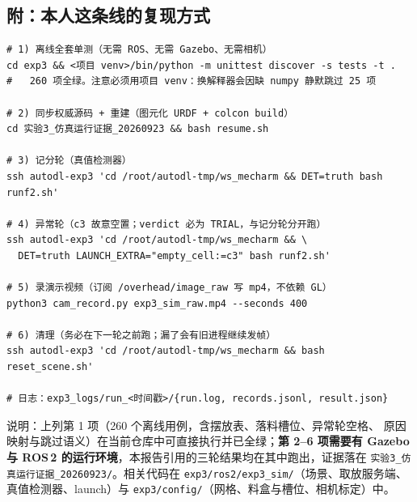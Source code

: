 \documentclass[12pt,a4paper]{ctexart}
\begin{document}
\subsection*{附：本人这条线的复现方式}

\begin{lstlisting}[numbers=none]
# 1) 离线全套单测（无需 ROS、无需 Gazebo、无需相机）
cd exp3 && <项目 venv>/bin/python -m unittest discover -s tests -t .
#   260 项全绿。注意必须用项目 venv：换解释器会因缺 numpy 静默跳过 25 项

# 2) 同步权威源码 + 重建（图元化 URDF + colcon build）
cd 实验3_仿真运行证据_20260923 && bash resume.sh

# 3) 记分轮（真值检测器）
ssh autodl-exp3 'cd /root/autodl-tmp/ws_mecharm && DET=truth bash runf2.sh'

# 4) 异常轮（c3 故意空置；verdict 必为 TRIAL，与记分轮分开跑）
ssh autodl-exp3 'cd /root/autodl-tmp/ws_mecharm && \
  DET=truth LAUNCH_EXTRA="empty_cell:=c3" bash runf2.sh'

# 5) 录演示视频（订阅 /overhead/image_raw 写 mp4，不依赖 GL）
python3 cam_record.py exp3_sim_raw.mp4 --seconds 400

# 6) 清理（务必在下一轮之前跑；漏了会有旧进程继续发帧）
ssh autodl-exp3 'cd /root/autodl-tmp/ws_mecharm && bash reset_scene.sh'

# 日志：exp3_logs/run_<时间戳>/{run.log, records.jsonl, result.json}
\end{lstlisting}

\vspace{2mm}
{\small 说明：上列第 1 项（260 个离线用例，含摆放表、落料槽位、异常轮空格、
原因映射与跳过语义）在当前仓库中可直接执行并已全绿；\textbf{第 2--6 项需要有
Gazebo 与 ROS\,2 的运行环境}，本报告引用的三轮结果均在其中跑出，证据落在
\texttt{实验3\_仿真运行证据\_20260923/}。相关代码在
\texttt{exp3/ros2/exp3\_sim/}（场景、取放服务端、真值检测器、launch）与
\texttt{exp3/config/}（网格、料盒与槽位、相机标定）中。}
\end{document}

